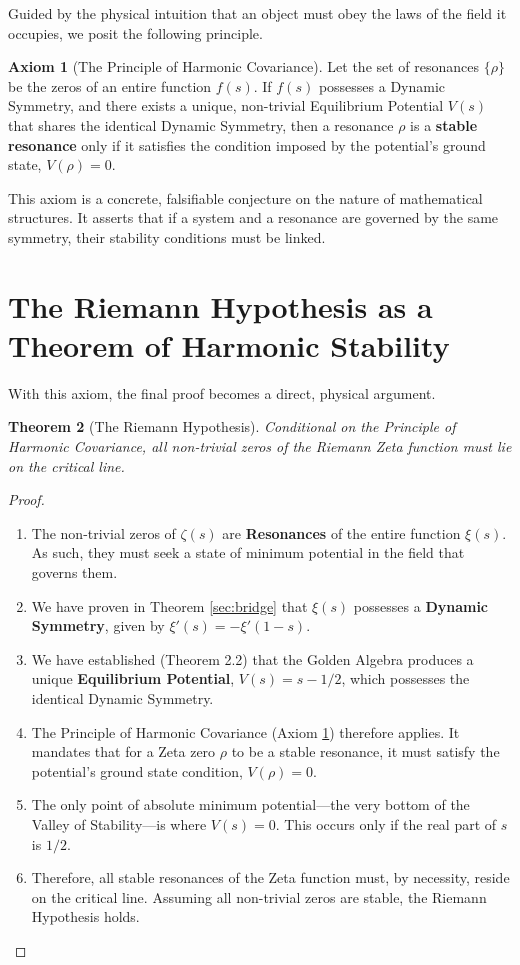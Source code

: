 \documentclass{article}
\theoremstyle{plain}
\newtheorem{theorem}{Theorem}[section]
\theoremstyle{definition}
\newtheorem{axiom}[theorem]{Axiom}
\theoremstyle{remark}
\begin{document}
Guided by the physical intuition that an object must obey the laws of the field it occupies, we posit the following principle.

\begin{axiom}[The Principle of Harmonic Covariance]
\label{ax:covariance}
Let the set of resonances $\{\rho\}$ be the zeros of an entire function $f(s)$. If $f(s)$ possesses a Dynamic Symmetry, and there exists a unique, non-trivial Equilibrium Potential $V(s)$ that shares the identical Dynamic Symmetry, then a resonance $\rho$ is a \textbf{stable resonance} only if it satisfies the condition imposed by the potential's ground state, $V(\rho)=0$.
\end{axiom}

This axiom is a concrete, falsifiable conjecture on the nature of mathematical structures. It asserts that if a system and a resonance are governed by the same symmetry, their stability conditions must be linked.

\section{The Riemann Hypothesis as a Theorem of Harmonic Stability}
\label{sec:proof}

With this axiom, the final proof becomes a direct, physical argument.

\begin{theorem}[The Riemann Hypothesis]
Conditional on the Principle of Harmonic Covariance, all non-trivial zeros of the Riemann Zeta function must lie on the critical line.
\end{theorem}
\begin{proof}
\begin{enumerate}
    \item The non-trivial zeros of $\zeta(s)$ are \textbf{Resonances} of the entire function $\xi(s)$. As such, they must seek a state of minimum potential in the field that governs them.
    \item We have proven in Theorem \ref{sec:bridge} that $\xi(s)$ possesses a \textbf{Dynamic Symmetry}, given by $\xi'(s) = -\xi'(1-s)$.
    \item We have established (Theorem 2.2) that the Golden Algebra produces a unique \textbf{Equilibrium Potential}, $V(s) = s - 1/2$, which possesses the identical Dynamic Symmetry.
    \item The Principle of Harmonic Covariance (Axiom \ref{ax:covariance}) therefore applies. It mandates that for a Zeta zero $\rho$ to be a stable resonance, it must satisfy the potential's ground state condition, $V(\rho)=0$.
    \item The only point of absolute minimum potential—the very bottom of the Valley of Stability—is where $V(s) = 0$. This occurs only if the real part of $s$ is $1/2$.
    \item Therefore, all stable resonances of the Zeta function must, by necessity, reside on the critical line. Assuming all non-trivial zeros are stable, the Riemann Hypothesis holds.
\end{enumerate}
\end{proof}
\end{document}
